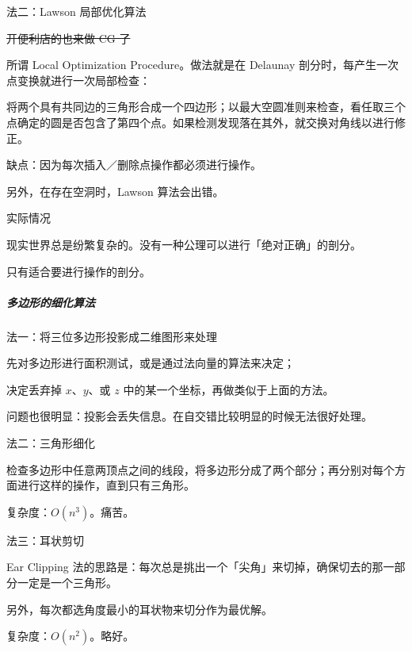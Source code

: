 \documentclass[
]{article}
\begin{document}
法二：Lawson 局部优化算法

\sout{开便利店的也来做 CG 了}

所谓 Local Optimization Procedure。做法就是在 Delaunay
剖分时，每产生一次点变换就进行一次局部检查：

将两个具有共同边的三角形合成一个四边形；以最大空圆准则来检查，看任取三个点确定的圆是否包含了第四个点。如果检测发现落在其外，就交换对角线以进行修正。

缺点：因为每次插入／删除点操作都必须进行操作。

另外，在存在空洞时，Lawson 算法会出错。

实际情况

现实世界总是纷繁复杂的。没有一种公理可以进行「绝对正确」的剖分。

只有适合要进行操作的剖分。

\hypertarget{header-n75}{%
\subparagraph{多边形的细化算法}\label{header-n75}}

法一：将三位多边形投影成二维图形来处理

先对多边形进行面积测试，或是通过法向量的算法来决定；

决定丢弃掉 \(x\)、\(y\)、或 \(z\) 中的某一个坐标，再做类似于上面的方法。

问题也很明显：投影会丢失信息。在自交错比较明显的时候无法很好处理。

法二：三角形细化

检查多边形中任意两顶点之间的线段，将多边形分成了两个部分；再分别对每个方面进行这样的操作，直到只有三角形。

复杂度：\(O(n^3)\)。痛苦。

法三：耳状剪切

Ear Clipping
法的思路是：每次总是挑出一个「尖角」来切掉，确保切去的那一部分一定是一个三角形。

另外，每次都选角度最小的耳状物来切分作为最优解。

复杂度：\(O(n^2)\)。略好。
\end{document}

